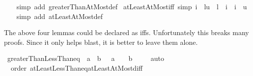 \begin{isabellebody}
%
\isadelimproof
\ \ %
\endisadelimproof
%
\isatagproof
{}\isamarkupfalse%
\ {\isacharparenleft}{\kern0pt}simp\ add{\isacharcolon}{\kern0pt}\ greaterThanAtMost{\isacharunderscore}{\kern0pt}def{\isacharparenright}{\kern0pt}%
\endisatagproof
{\isafoldproof}%
%
\isadelimproof
\isanewline
%
\endisadelimproof
\isanewline
{}\isamarkupfalse%
\ atLeastAtMost{\isacharunderscore}{\kern0pt}iff\ {\isacharbrackleft}{\kern0pt}simp{\isacharbrackright}{\kern0pt}{\isacharcolon}{\kern0pt}\ {\isachardoublequoteopen}{\isacharparenleft}{\kern0pt}i\ {\isasymin}\ {\isacharbraceleft}{\kern0pt}l{\isachardot}{\kern0pt}{\isachardot}{\kern0pt}u{\isacharbraceright}{\kern0pt}{\isacharparenright}{\kern0pt}\ {\isacharequal}{\kern0pt}\ {\isacharparenleft}{\kern0pt}l\ {\isasymle}\ i\ {\isasymand}\ i\ {\isasymle}\ u{\isacharparenright}{\kern0pt}{\isachardoublequoteclose}\isanewline
%
\isadelimproof
\ \ %
\endisadelimproof
%
\isatagproof
{}\isamarkupfalse%
\ {\isacharparenleft}{\kern0pt}simp\ add{\isacharcolon}{\kern0pt}\ atLeastAtMost{\isacharunderscore}{\kern0pt}def{\isacharparenright}{\kern0pt}%
\endisatagproof
{\isafoldproof}%
%
\isadelimproof
%
\endisadelimproof
%
\begin{isamarkuptext}%
The above four lemmas could be declared as iffs. Unfortunately this
breaks many proofs. Since it only helps blast, it is better to leave them
alone.%
\end{isamarkuptext}\isamarkuptrue%
\isamarkupfalse%
\ greaterThanLessThan{\isacharunderscore}{\kern0pt}eq{\isacharcolon}{\kern0pt}\ {\isachardoublequoteopen}{\isacharbraceleft}{\kern0pt}\ a\ {\isacharless}{\kern0pt}{\isachardot}{\kern0pt}{\isachardot}{\kern0pt}{\isacharless}{\kern0pt}\ b{\isacharbraceright}{\kern0pt}\ {\isacharequal}{\kern0pt}\ {\isacharbraceleft}{\kern0pt}\ a\ {\isacharless}{\kern0pt}{\isachardot}{\kern0pt}{\isachardot}{\kern0pt}{\isacharbraceright}{\kern0pt}\ {\isasyminter}\ {\isacharbraceleft}{\kern0pt}{\isachardot}{\kern0pt}{\isachardot}{\kern0pt}{\isacharless}{\kern0pt}\ b\ {\isacharbraceright}{\kern0pt}{\isachardoublequoteclose}\isanewline
%
\isadelimproof
\ \ %
\endisadelimproof
%
\isatagproof
{}\isamarkupfalse%
\ auto%
\endisatagproof
{\isafoldproof}%
%
\isadelimproof
\isanewline
%
\endisadelimproof
\isanewline
{}\isamarkupfalse%
\ {\isacharparenleft}{\kern0pt}\ order{\isacharparenright}{\kern0pt}\ atLeastLessThan{\isacharunderscore}{\kern0pt}eq{\isacharunderscore}{\kern0pt}atLeastAtMost{\isacharunderscore}{\kern0pt}diff{\isacharcolon}{\kern0pt}\isanewline

\end{isabellebody}
